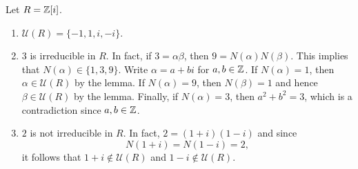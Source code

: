 \begin{example}
	Let $R=\mathbb{Z}[i]$. 
	\begin{enumerate}
		\item $\mathcal{U}(R)=\{-1,1,i,-i\}$.
		\item $3$ is irreducible in $R$. In fact, if $3=\alpha\beta$, then
			$9=N(\alpha)N(\beta)$. This implies that $N(\alpha)\in\{1,3,9\}$. Write
			$\alpha=a+bi$ for $a,b\in\mathbb{Z}$. If $N(\alpha)=1$, then $\alpha\in\mathcal{U}(R)$ by the lemma. 
			If $N(\alpha)=9$, then $N(\beta)=1$ and hence $\beta\in\mathcal{U}(R)$ by the lemma. Finally, 
			if $N(\alpha)=3$, then $a^2+b^2=3$, which is a contradiction since $a,b\in\mathbb{Z}$. 
		\item $2$ is not irreducible in $R$. In fact, $2=(1+i)(1-i)$ and
			since \[
			N(1+i)=N(1-i)=2,
			\]
			it follows that $1+i\not\in\mathcal{U}(R)$ 
			and $1-i\not\in\mathcal{U}(R)$. 
	\end{enumerate}	
\end{example}

